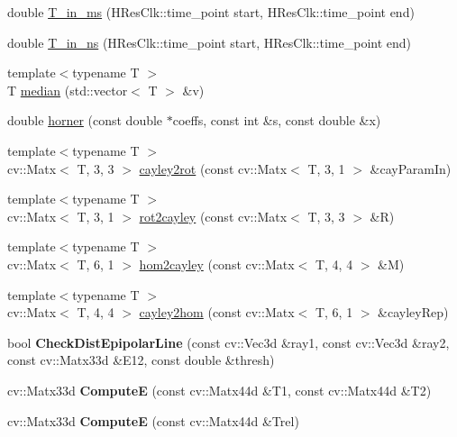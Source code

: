 \begin{DoxyCompactItemize}
\item 
double \hyperlink{namespaceMultiColSLAM_a456deb26b63f885dc40b5f2bd972e3b1}{T\+\_\+in\+\_\+ms} (H\+Res\+Clk\+::time\+\_\+point start, H\+Res\+Clk\+::time\+\_\+point end)
\item 
double \hyperlink{namespaceMultiColSLAM_a29255d78ed9e43d9768e2461351da22a}{T\+\_\+in\+\_\+ns} (H\+Res\+Clk\+::time\+\_\+point start, H\+Res\+Clk\+::time\+\_\+point end)
\item 
{\footnotesize template$<$typename T $>$ }\\T \hyperlink{namespaceMultiColSLAM_ac94bde36f6aefbba6574667b47b7594f}{median} (std\+::vector$<$ T $>$ \&v)
\item 
double \hyperlink{namespaceMultiColSLAM_aead0992d54c67c406d668cff0e396838}{horner} (const double $\ast$coeffs, const int \&s, const double \&x)
\item 
{\footnotesize template$<$typename T $>$ }\\cv\+::\+Matx$<$ T, 3, 3 $>$ \hyperlink{namespaceMultiColSLAM_a6780938c761743e617c798b5558e470c}{cayley2rot} (const cv\+::\+Matx$<$ T, 3, 1 $>$ \&cay\+Param\+In)
\item 
{\footnotesize template$<$typename T $>$ }\\cv\+::\+Matx$<$ T, 3, 1 $>$ \hyperlink{namespaceMultiColSLAM_a7c034d80e41334c8f8144983a6337b61}{rot2cayley} (const cv\+::\+Matx$<$ T, 3, 3 $>$ \&R)
\item 
{\footnotesize template$<$typename T $>$ }\\cv\+::\+Matx$<$ T, 6, 1 $>$ \hyperlink{namespaceMultiColSLAM_a23b15483afb841352e467cb7d6234bbd}{hom2cayley} (const cv\+::\+Matx$<$ T, 4, 4 $>$ \&M)
\item 
{\footnotesize template$<$typename T $>$ }\\cv\+::\+Matx$<$ T, 4, 4 $>$ \hyperlink{namespaceMultiColSLAM_a178d0cf0a5ecf43836fe2efb8542ac13}{cayley2hom} (const cv\+::\+Matx$<$ T, 6, 1 $>$ \&cayley\+Rep)
\item 
bool {\bfseries Check\+Dist\+Epipolar\+Line} (const cv\+::\+Vec3d \&ray1, const cv\+::\+Vec3d \&ray2, const cv\+::\+Matx33d \&E12, const double \&thresh)\hypertarget{namespaceMultiColSLAM_aab367384cef99414986b8ba1e47f35c5}{}\label{namespaceMultiColSLAM_aab367384cef99414986b8ba1e47f35c5}

\item 
cv\+::\+Matx33d {\bfseries ComputeE} (const cv\+::\+Matx44d \&T1, const cv\+::\+Matx44d \&T2)\hypertarget{namespaceMultiColSLAM_ad0f8b7070cf3475efa87d97afee600a0}{}\label{namespaceMultiColSLAM_ad0f8b7070cf3475efa87d97afee600a0}

\item 
cv\+::\+Matx33d {\bfseries ComputeE} (const cv\+::\+Matx44d \&Trel)\hypertarget{namespaceMultiColSLAM_a33726aa0e04035feddd458e5102db99d}{}\label{namespaceMultiColSLAM_a33726aa0e04035feddd458e5102db99d}

\end{DoxyCompactItemize}
